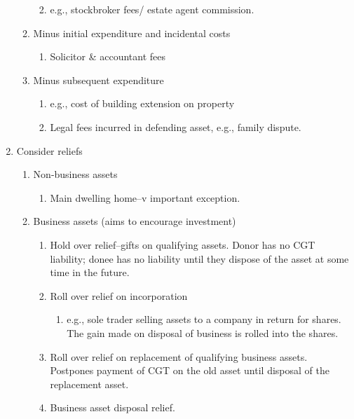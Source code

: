 \documentclass[
]{article}
\providecommand{\tightlist}{%
  \setlength{\itemsep}{0pt}\setlength{\parskip}{0pt}}
\begin{document}
\begin{enumerate}
\begin{enumerate}
    \begin{enumerate}
    \def\labelenumiii{\arabic{enumiii}.}
    \tightlist
    \item
      e.g., stockbroker fees/ estate agent commission.
    \end{enumerate}
  \item
    Minus initial expenditure and incidental costs

    \begin{enumerate}
    \def\labelenumiii{\arabic{enumiii}.}
    \tightlist
    \item
      Solicitor \& accountant fees
    \end{enumerate}
  \item
    Minus subsequent expenditure

    \begin{enumerate}
    \def\labelenumiii{\arabic{enumiii}.}
    \tightlist
    \item
      e.g., cost of building extension on property
    \item
      Legal fees incurred in defending asset, e.g., family dispute.
    \end{enumerate}
  \end{enumerate}
\item
  Consider reliefs

  \begin{enumerate}
  \def\labelenumii{\arabic{enumii}.}
  \tightlist
  \item
    Non-business assets

    \begin{enumerate}
    \def\labelenumiii{\arabic{enumiii}.}
    \tightlist
    \item
      Main dwelling home--v important exception.
    \end{enumerate}
  \item
    Business assets (aims to encourage investment)

    \begin{enumerate}
    \def\labelenumiii{\arabic{enumiii}.}
    \tightlist
    \item
      Hold over relief--gifts on qualifying assets. Donor has no CGT
      liability; donee has no liability until they dispose of the asset
      at some time in the future.
    \item
      Roll over relief on incorporation

      \begin{enumerate}
      \def\labelenumiv{\arabic{enumiv}.}
      \tightlist
      \item
        e.g., sole trader selling assets to a company in return for
        shares. The gain made on disposal of business is rolled into the
        shares.
      \end{enumerate}
    \item
      Roll over relief on replacement of qualifying business assets.
      Postpones payment of CGT on the old asset until disposal of the
      replacement asset.
    \item
      Business asset disposal relief.


\end{enumerate}
\end{enumerate}
\end{enumerate}
\end{document}
